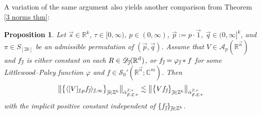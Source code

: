 \documentclass[11pt, reqno]{amsart}
\newtheorem{proposition}[theorem]{Proposition}
\theoremstyle{definition}
\theoremstyle{remark}
\numberwithin{equation}{section}
\newcommand{\A}{\mathscr A}
\newcommand{\C}{\mathbb C}
\newcommand{\D}{\mathscr D}
\newcommand{\R}{\mathbb R}
\newcommand{\Sc}{\mathscr S}
\newcommand{\Z}{\mathbb Z}
\newcommand{\vj}{\vec{\textit{\j}}}
\newcommand{\vn}{\vec n}
\newcommand{\vp}{\vec p}
\newcommand{\vq}{\vec q}
\newcommand{\vs}{\vec s}
\newcommand{\aatau}{\dot{\alpha}^{\vs,\tau}_{\vp,\vq,\pi}}
\newcommand{\Ave}[3]{\langle#1\rangle_{#2,#3}}
\newcommand{\Red}[3]{[#1]_{#2,#3}}
\newcommand{\bNorm}[2]{\big\|#1\big\|_{#2}}
\begin{document}
A variation of the same argument also yields another comparison from Theorem \ref{3 norms thm}:

\begin{proposition}\label{sup vs V}
Let $\vs\in\R^k$, $\tau\in[0,\infty)$, $p\in(0,\infty)$, $\vp:=p\cdot\vec 1$, $\vq\in(0,\infty]^k$,
and $\pi\in S_{[2k]}$ be an admissible permutation of $(\vp,\vq)$.
Assume that $V\in\A_p(\R^{\vn})$
and $f_{\vj}$ is either constant on each $R\in\D_{\vj}(\R^{\vn})$, or $f_{\vj}=\varphi_{\vj}*f$ for some Littlewood--Paley function $\varphi$ and $f\in\Sc_0'(\R^{\vn};\C^m)$.
Then
\begin{equation*}
\bNorm{\big\{\Ave{\Red{V}{\vj}{p}f_{\vj}}{\vj}{\infty}\big\}_{\vj\in\Z^k} }{\aatau}
\lesssim
\bNorm{\big\{V f_{\vj}\big\}_{\vj\in\Z^k} }{\aatau}
\end{equation*}
with the implicit positive constant independent of
$\{f_{\vj}\}_{\vj\in\Z^k}$.
\end{proposition}
\end{document}
